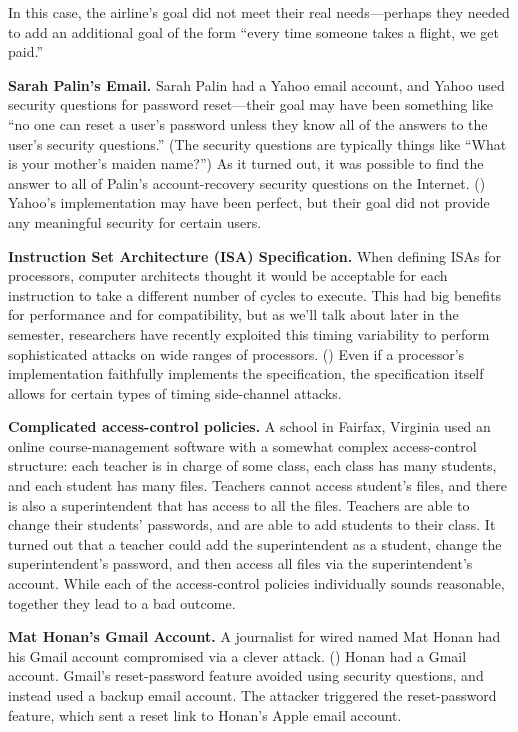 \documentclass[
  letterpaper,
]{scrbook}
\theoremstyle{definition}
\theoremstyle{plain}
\theoremstyle{plain}
\theoremstyle{remark}
\begin{document}
In this case, the airline's goal did not meet their real needs---perhaps
they needed to add an additional goal of the form ``every time someone
takes a flight, we get paid.''

\textbf{Sarah Palin's Email.} Sarah Palin had a Yahoo email account, and
Yahoo used security questions for password reset---their goal may have
been something like ``no one can reset a user's password unless they
know all of the answers to the user's security questions.'' (The
security questions are typically things like ``What is your mother's
maiden name?'') As it turned out, it was possible to find the answer to
all of Palin's account-recovery security questions on the Internet.
() Yahoo's implementation may have been
perfect, but their goal did not provide any meaningful security for
certain users.

\textbf{Instruction Set Architecture (ISA) Specification.} When defining
ISAs for processors, computer architects thought it would be acceptable
for each instruction to take a different number of cycles to execute.
This had big benefits for performance and for compatibility, but as
we'll talk about later in the semester, researchers have recently
exploited this timing variability to perform sophisticated attacks on
wide ranges of processors. () Even if a processor's implementation faithfully implements
the specification, the specification itself allows for certain types of
timing side-channel attacks.

\textbf{Complicated access-control policies.} A school in Fairfax,
Virginia used an online course-management software with a somewhat
complex access-control structure: each teacher is in charge of some
class, each class has many students, and each student has many files.
Teachers cannot access student's files, and there is also a
superintendent that has access to all the files. Teachers are able to
change their students' passwords, and are able to add students to their
class. It turned out that a teacher could add the superintendent as a
student, change the superintendent's password, and then access all files
via the superintendent's account. While each of the access-control
policies individually sounds reasonable, together they lead to a bad
outcome.

\textbf{Mat Honan's Gmail Account.} A journalist for wired named Mat
Honan had his Gmail account compromised via a clever attack.
() Honan had a Gmail account. Gmail's
reset-password feature avoided using security questions, and instead
used a backup email account. The attacker triggered the reset-password
feature, which sent a reset link to Honan's Apple email account.
\end{document}
